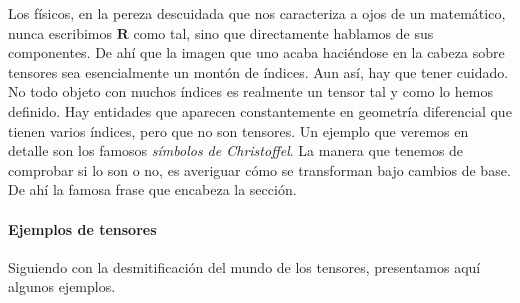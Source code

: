 Los físicos, en la pereza descuidada que nos caracteriza a ojos de un matemático, nunca escribimos \(\mathbf{R}\) como tal, sino que directamente hablamos de sus componentes. De ahí que la imagen que uno acaba haciéndose en la cabeza sobre tensores sea esencialmente un montón de índices. Aun así, hay que tener cuidado. No todo objeto con muchos índices es realmente un tensor tal y como lo hemos definido. Hay entidades que aparecen constantemente en geometría diferencial que tienen varios índices, pero que no son tensores. Un ejemplo que veremos en detalle son los famosos \emph{símbolos de Christoffel}. La manera que tenemos de comprobar si lo son o no, es averiguar cómo se transforman bajo cambios de base. De ahí la famosa frase que encabeza la sección.

\paragraph{Ejemplos de tensores} Siguiendo con la desmitificación del mundo de los tensores, presentamos aquí algunos ejemplos.
